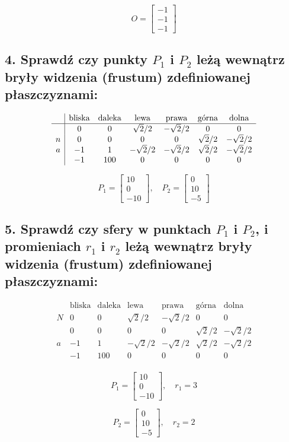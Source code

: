\begin{enumerate}
    \[
    O = \begin{bmatrix} -1 \\ -1 \\ -1 \end{bmatrix}
    \]

\end{enumerate}
\subsection*{4. Sprawdź czy punkty \( P_1 \) i \( P_2 \) leżą wewnątrz bryły widzenia (frustum) zdefiniowanej płaszczyznami:}

\[
\begin{array}{c|cccccc}
    & \text{bliska} & \text{daleka} & \text{lewa} & \text{prawa} & \text{górna} & \text{dolna} \\
    \hline
    & 0 & 0 & \sqrt{2}/2 & -\sqrt{2}/2 & 0 & 0 \\
    n & 0 & 0 & 0 & 0 & \sqrt{2}/2 & -\sqrt{2}/2 \\
    a & -1 & 1 & -\sqrt{2}/2 & -\sqrt{2}/2 & \sqrt{2}/2 & -\sqrt{2}/2 \\
    & -1 & 100 & 0 & 0 & 0 & 0 \\
\end{array}
\]

\[
P_1 = \begin{bmatrix} 10 \\ 0 \\ -10 \end{bmatrix}, \quad
P_2 = \begin{bmatrix} 0 \\ 10 \\ -5 \end{bmatrix}
\]


\subsection*{5. Sprawdź czy sfery w punktach \( P_1 \) i \( P_2 \), i promieniach \( r_1 \) i \( r_2 \) leżą wewnątrz bryły widzenia (frustum) zdefiniowanej płaszczyznami:}

\[
\begin{array}{c|cccccc}
    & \text{bliska} & \text{daleka} & \text{lewa} & \text{prawa} & \text{górna} & \text{dolna} \\
    \hline
    N & 0 & 0 & \sqrt{2}/2 & -\sqrt{2}/2 & 0 & 0 \\
    & 0 & 0 & 0 & 0 & \sqrt{2}/2 & -\sqrt{2}/2 \\
    a & -1 & 1 & -\sqrt{2}/2 & -\sqrt{2}/2 & \sqrt{2}/2 & -\sqrt{2}/2 \\
    & -1 & 100 & 0 & 0 & 0 & 0 \\
\end{array}
\]

\[
P_1 = \begin{bmatrix} 10 \\ 0 \\ -10 \end{bmatrix}, \quad r_1 = 3
\]

\[
P_2 = \begin{bmatrix} 0 \\ 10 \\ -5 \end{bmatrix}, \quad r_2 = 2
\]


